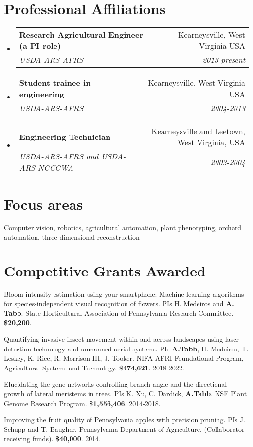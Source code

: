 \documentclass[letterpaper,11pt]{article}
\makeatletter
\newcommand{\resumeSubheading}[4]{
  \vspace{-1pt}\item
    \begin{tabular*}{0.97\textwidth}{l@{\extracolsep{\fill}}r}
      \textbf{#1} & #2 \\
      \textit{\small#3} & \textit{\small #4} \\
    \end{tabular*}\vspace{-5pt}
}
\makeatother
\begin{document}
\section{Professional Affiliations}
\begin{itemize}[leftmargin=*,label=]
    \resumeSubheading
    {Research Agricultural Engineer (a PI role)}{Kearneysville, West Virginia USA}
      {USDA-ARS-AFRS}{2013-present}
	
     \resumeSubheading
       {Student trainee in engineering}{Kearneysville, West Virginia USA}
	{USDA-ARS-AFRS}{2004-2013}
    \resumeSubheading
    {Engineering Technician}{Kearneysville and Leetown, West Virginia, USA}
      {USDA-ARS-AFRS and USDA-ARS-NCCCWA}{2003-2004}

\end{itemize}

\section{Focus areas}
Computer vision, robotics, agricultural automation, plant phenotyping, orchard automation, three-dimensional reconstruction

\section{Competitive Grants Awarded}
\begin{enumerate}[noitemsep, leftmargin=*,label={[G\arabic*]}]
\item{Bloom intensity estimation using your smartphone: Machine learning algorithms for species-independent visual recognition of flowers.  PIs H. Medeiros and \textbf{A. Tabb}.  State Horticultural Association of Pennsylvania Research Committee.  {\bf \$20,200}.}
\item{Quantifying invasive insect movement within and across landscapes using laser detection technology and unmanned aerial systems. PIs \textbf{A.Tabb}, H. Medeiros, T. Leskey, K. Rice, R. Morrison III, J. Tooker. NIFA AFRI Foundational Program, Agricultural Systems and Technology. {\bf\$474,621}. 2018-2022.}
\item{Elucidating the gene networks controlling branch angle and the directional growth of lateral meristems in trees.  PIs K. Xu, C. Dardick, \textbf{A.Tabb}. NSF Plant Genome Research Program. {\bf\$1,556,406}. 2014-2018.}
\item{Improving the fruit quality of Pennsylvania apples with precision pruning.  PIs J. Schupp and T. Baugher. Pennsylvania Department of Agriculture.  (Collaborator receiving funds). {\bf\$40,000}. 2014.}
\end{enumerate}
\end{document}
